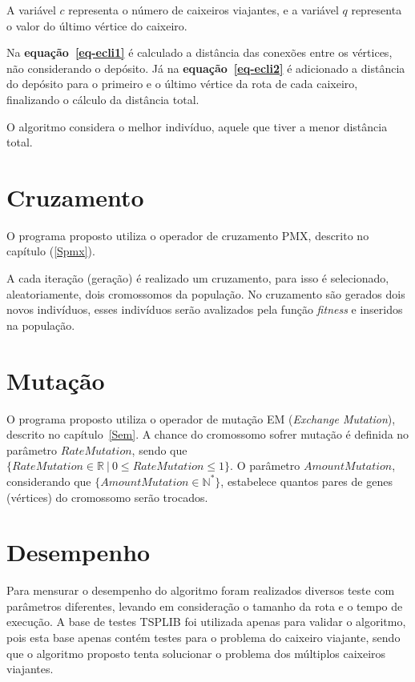\documentclass[12pt,openright,a4paper,oneside]{tcc}
\begin{document}
		A variável $c$ representa o número de caixeiros viajantes, e a variável $q$ representa o valor do último vértice do caixeiro.

		Na \textbf{equação~\ref{eq-ecli1}} é calculado a distância das conexões entre os vértices, não considerando o depósito. Já na \textbf{equação~\ref{eq-ecli2}} é adicionado a distância do depósito para o primeiro e o último vértice da rota de cada caixeiro, finalizando o cálculo da distância total.

		O algoritmo considera o melhor indivíduo, aquele que tiver a menor distância total. 

		\section{Cruzamento}

			O programa proposto utiliza o operador de cruzamento PMX, descrito no capítulo (\ref{Spmx}). 
			
			A cada iteração (geração) é realizado um cruzamento, para isso é selecionado, aleatoriamente, dois cromossomos da população. No cruzamento são gerados dois novos indivíduos, esses indivíduos serão avalizados pela função \textit{fitness} e inseridos na população.

		\section{Mutação}

			O programa proposto utiliza o operador de mutação EM (\textit{Exchange Mutation}), descrito no capítulo~\ref{Sem}. A chance do cromossomo sofrer mutação é definida no parâmetro $RateMutation$, sendo que $\{RateMutation \in \mathbb{R}~|~ 0 \leq RateMutation \leq 1\}$. O parâmetro  $AmountMutation$, considerando que  $\{AmountMutation \in \mathbb{N}^*\}$, estabelece quantos pares de genes (vértices) do cromossomo serão trocados.
						
		
			
		\section{Desempenho}
		
		Para mensurar o desempenho do algoritmo foram realizados diversos teste com parâmetros diferentes, levando em consideração o tamanho da rota e o tempo de execução. A base de testes TSPLIB foi utilizada apenas para validar o algoritmo, pois esta base apenas contém testes para o problema do caixeiro viajante, sendo que o algoritmo proposto tenta solucionar o problema dos múltiplos caixeiros viajantes. 
		
\end{document}

